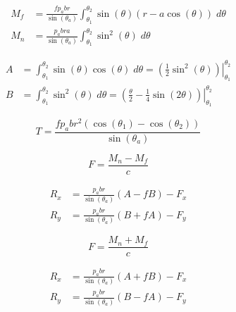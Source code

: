 \documentclass[12pt, letterpaper]{extarticle}
\begin{document}
% 






\begin{align*}
    M_{f} &= \frac{fp_{a}br}{\sin(\theta_{a})} \int_{\theta_{1}}^{\theta_{2}} \sin(\theta) (r - a\cos(\theta)) \; d\theta \\
    M_{n} &= \frac{p_{a}bra}{\sin(\theta_{a})} \int_{\theta_{1}}^{\theta_{2}} \sin^{2}(\theta) \; d\theta
\end{align*}

\begin{align*}
    A &= \int_{\theta_{1}}^{\theta_{2}} \sin(\theta)\cos(\theta) \; d\theta = \left.\left(\frac{1}{2}\sin^{2}(\theta)\right) \right|_{\theta_{1}}^{\theta_{2}} \\
    B &= \int_{\theta_{1}}^{\theta_{2}} \sin^{2}(\theta) \; d\theta = \left.\left(\frac{\theta}{2} - \frac{1}{4}\sin(2\theta)\right) \right|_{\theta_{1}}^{\theta_{2}}
\end{align*}

\begin{equation*}
    T = \frac{fp_{a}br^2(\cos(\theta_{1}) - \cos(\theta_{2}))}{\sin(\theta_{a})}
\end{equation*}



\begin{equation*}
    F = \frac{M_{n} - M_{f}}{c}
\end{equation*}

\begin{align*}
    R_{x} &= \frac{p_{a}br}{\sin(\theta_{a})}(A - fB) - F_{x} \\
    R_{y} &= \frac{p_{a}br}{\sin(\theta_{a})}(B + fA) - F_{y}
\end{align*}


\begin{equation*}
    F = \frac{M_{n} + M_{f}}{c}
\end{equation*}

\begin{align*}
    R_{x} &= \frac{p_{a}br}{\sin(\theta_{a})}(A + fB) - F_{x} \\
    R_{y} &= \frac{p_{a}br}{\sin(\theta_{a})}(B - fA) - F_{y}
\end{align*}
\end{document}
